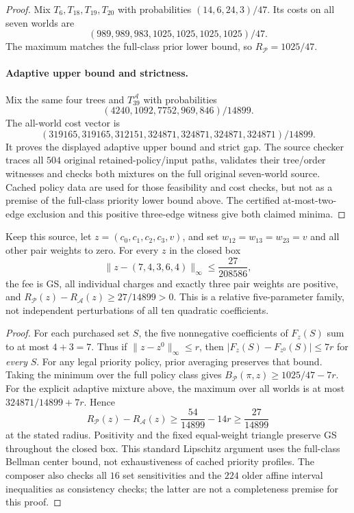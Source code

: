 \begin{proof}
Mix $T_6,T_{18},T_{19},T_{20}$ with probabilities
$(14,6,24,3)/47$. Its costs on all seven worlds are
\[
 (989,989,983,1025,1025,1025,1025)/47.
\]
The maximum matches the full-class prior lower bound, so
$R_{\mathcal P}=1025/47$.

\paragraph*{Adaptive upper bound and strictness.}
Mix the same four trees and $T_{39}^{\mathcal A}$ with probabilities
\[
 (4240,1092,7752,969,846)/14899.
\]
The all-world cost vector is
\[
 (319165,319165,312151,324871,324871,324871,324871)/14899.
\]
It proves the displayed adaptive upper bound and strict gap.
The source checker traces all $504$ original retained-policy/input
paths, validates their tree/order witnesses and checks both mixtures
on the full original seven-world source. Cached policy data are
used for those feasibility and cost checks, but not as a premise
of the full-class priority lower bound above. The certified
at-most-two-edge exclusion and this positive three-edge witness
give both claimed minima.
\end{proof}

\begin{corollary}
\label{cor:gs-relative-robustness}
Keep this source, let $z=(c_0,c_1,c_2,c_3,v)$, and set
$w_{12}=w_{13}=w_{23}=v$ and all other pair weights to zero.
For every $z$ in the closed box
\[
 \|z-(7,4,3,6,4)\|_\infty\leq\frac{27}{208586},
\]
the fee is GS, all individual charges and exactly three pair
weights are positive, and
$R_{\mathcal P}(z)-R_{\mathcal A}(z)\geq27/14899>0$.
This is a relative five-parameter family, not independent
perturbations of all ten quadratic coefficients.
\end{corollary}
\begin{proof}
For each purchased set $S$, the five nonnegative coefficients
of $F_z(S)$ sum to at most $4+3=7$. Thus if
$\|z-z^0\|_\infty\leq r$, then
$|F_z(S)-F_{z^0}(S)|\leq7r$ for \emph{every} $S$.
For any legal priority policy, prior averaging preserves that
bound. Taking the minimum over the full policy class gives
$B_{\mathcal P}(\pi,z)\geq1025/47-7r$.
For the explicit adaptive mixture above, the maximum over all
worlds is at most $324871/14899+7r$. Hence
\[
 R_{\mathcal P}(z)-R_{\mathcal A}(z)
   \geq\frac{54}{14899}-14r
   \geq\frac{27}{14899}
\]
at the stated radius. Positivity and the fixed equal-weight
triangle preserve GS throughout the closed box. This standard
Lipschitz argument uses the full-class Bellman center bound,
not exhaustiveness of cached priority profiles. The composer
also checks all $16$ set sensitivities and the $224$ older affine
interval inequalities as consistency checks; the latter are
not a completeness premise for this proof.
\end{proof}

